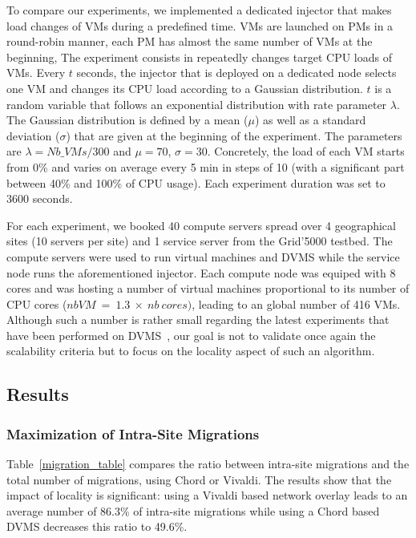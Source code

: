 To compare our experiments, we implemented a dedicated injector that makes load changes of
VMs during a predefined time. VMs are launched on PMs in a round-robin manner, \ie each
PM has almost the same number of VMs at the beginning, The experiment consists in
repeatedly changes target CPU loads of VMs. Every $t$ seconds, the injector that is
deployed on a dedicated node selects one VM and changes its CPU load according to a
Gaussian distribution. $t$ is a random variable that follows an exponential distribution
with rate parameter $\lambda$. The Gaussian distribution is defined by a mean ($\mu$) as
well as a standard deviation ($\sigma$) that are given at the beginning of the experiment.
The parameters are $\lambda=\mathit{Nb\_VMs}/300$ and $\mu=70$, $\sigma=30$.
Concretely, the load of each VM starts from 0\% and varies on average every 5
min in steps of 10 (with a significant part between 40\% and 100\% of CPU
usage). Each experiment duration was set to 3600 seconds.

For each experiment, we booked 40 compute servers spread over 4 geographical sites (10
servers per site) and 1 service server from the Grid'5000 testbed. The compute servers
were used to run virtual machines and DVMS while the service node runs the aforementioned
injector.
%
Each compute node was equiped with 8 cores and was hosting a number of virtual machines
proportional to its number of CPU cores ($nb VM\ =\ 1.3\ \times\ nb\ cores)$, leading to
an global number of 416 VMs. Although such a number is rather small regarding the latest
experiments that have been performed on DVMS~\cite{quesnel:ispa2013}, our goal is not to
validate once again the scalability criteria but to focus on the locality aspect of such
an algorithm.

\subsection{Results}

\subsubsection{Maximization of Intra-Site Migrations}

Table~\ref{migration_table} compares the ratio between intra-site migrations and the total
number of migrations, using Chord or Vivaldi. The results show that the impact of locality
is significant: using a Vivaldi based network overlay leads to an average number of 86.3\%
of intra-site migrations while using a Chord based DVMS decreases this ratio to 49.6\%.

